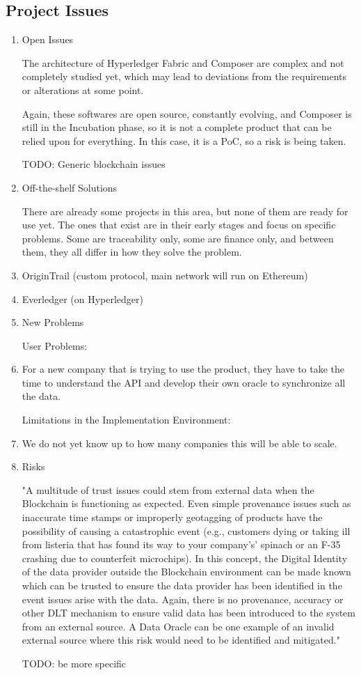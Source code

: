 \subsection*{Project Issues}
\begin{enumerate}
	\item Open Issues
		\par The architecture of Hyperledger Fabric and Composer are complex and not completely studied yet, which may lead to deviations from the requirements or alterations at some point.
		\par Again, these softwares are open source, constantly evolving, and Composer is still in the Incubation phase, so it is not a complete product that can be relied upon for everything. In this 
		case, it is a PoC, so a risk is being taken.
		\par TODO: Generic blockchain issues
	
    \item Off-the-shelf Solutions
		\par There are already some projects in this area, but none of them are ready for use yet. The ones that exist are in their early stages and focus on specific problems. Some are traceability only, some are finance only, and between them, they all differ in how they solve the problem.
			\item OriginTrail (custom protocol, main network will run on Ethereum)
			\item Everledger (on Hyperledger)
			
    \item New Problems
		\par User Problems: 
			\item For a new company that is trying to use the product, they have to take the time to understand the API and develop their own oracle to synchronize all the data. 
		\par Limitations in the Implementation Environment:
			\item We do not yet know up to how many companies this will be able to scale.
		
    \item Risks
		\par "A multitude of trust issues could stem from external data when the Blockchain is functioning as expected. Even simple provenance issues such as inaccurate time stamps or improperly geotagging of products have the possibility of causing a catastrophic event (e.g., customers dying or taking ill from listeria that has found its way to your company's’ spinach or an F-35 crashing due to counterfeit microchips). In this concept, the Digital Identity of the data provider outside the Blockchain environment can be made known which can be trusted to ensure the data provider has been identified in the event issues arise with the data. Again, there is no provenance, accuracy or other DLT mechanism to ensure valid data has been introduced to the system from an external source. A Data Oracle can be one example of an invalid external source where this risk would need to be identified and mitigated."
		\par TODO: be more specific
		

\end{enumerate}
